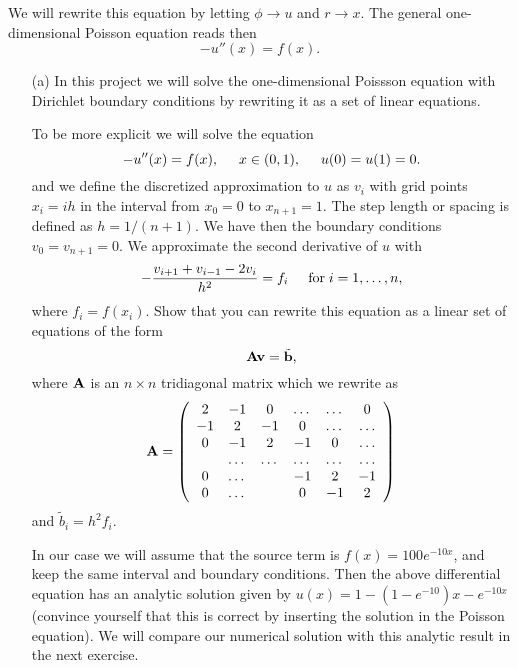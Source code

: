 \documentclass[11pt,a4wide]{article}
\begin{document}
We will rewrite this equation by letting $\phi\rightarrow u$ and 
$r\rightarrow x$. 
The general one-dimensional Poisson equation reads then 
\[
-u''(x) = f(x).
\]

\begin{enumerate}
\item[(a)] 
In this project we will solve the one-dimensional Poissson equation
with Dirichlet boundary conditions by rewriting it as a set of linear equations.


To be more explicit we will solve the equation
\[
-u''(x) = f(x), \hspace{0.5cm} x\in(0,1), \hspace{0.5cm} u(0) = u(1) = 0.
\]
and we define the discretized approximation  to $u$ as $v_i$  with 
grid points $x_i=ih$   in the interval from $x_0=0$ to $x_{n+1}=1$.
The step length or spacing is defined as $h=1/(n+1)$. 
We have then the boundary conditions $v_0 = v_{n+1} = 0$.
We  approximate the second
derivative of $u$ with 
\[
   -\frac{v_{i+1}+v_{i-1}-2v_i}{h^2} = f_i  \hspace{0.5cm} \mathrm{for} \hspace{0.1cm} i=1,\dots, n,
\]
where $f_i=f(x_i)$.
Show that you can rewrite this equation as a linear set of equations of the form 
\[
   {\bf A}{\bf v} = \tilde{{\bf b}},
\]
where ${\bf A}$ is an $n\times n$  tridiagonal matrix which we rewrite as 
\begin{equation}
    {\bf A} = \left(\begin{array}{cccccc}
                           2& -1& 0 &\dots   & \dots &0 \\
                           -1 & 2 & -1 &0 &\dots &\dots \\
                           0&-1 &2 & -1 & 0 & \dots \\
                           & \dots   & \dots &\dots   &\dots & \dots \\
                           0&\dots   &  &-1 &2& -1 \\
                           0&\dots    &  & 0  &-1 & 2 \\
                      \end{array} \right)
\end{equation}
and $\tilde{b}_i=h^2f_i$.


In our case we will assume  that the source term is 
$f(x) = 100e^{-10x}$, and keep the same interval and boundary 
conditions. Then the above differential equation
has an analytic solution given by $u(x) = 1-(1-e^{-10})x-e^{-10x}$ (convince yourself that this is correct by inserting the
solution in the Poisson equation).  We will compare
our numerical solution with this analytic result in the next exercise. 


\end{enumerate}
\end{document}

